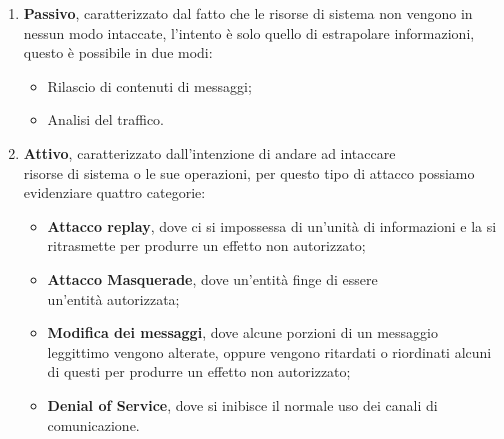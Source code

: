 \documentclass[14pt]{extarticle}
\begin{document}
\begin{enumerate}
    \item \textbf{Passivo}, caratterizzato dal fatto che le risorse di sistema
    non vengono in nessun modo intaccate, l'intento è solo quello di estrapolare
    informazioni, questo è possibile in due modi:
    \begin{itemize}
        \item Rilascio di contenuti di messaggi;
        \item Analisi del traffico.
    \end{itemize}
    \item \textbf{Attivo}, caratterizzato dall'intenzione di andare ad intaccare
    \\ risorse di sistema o le sue operazioni, per questo tipo di attacco
    possiamo evidenziare quattro categorie:
    \begin{itemize}
        \item \textbf{Attacco replay}, dove ci si impossessa di un'unità di
        informazioni e la si ritrasmette per produrre un effetto non
        autorizzato;
        \item \textbf{Attacco Masquerade}, dove un'entità finge di essere \\
        un'entità autorizzata;
        \item \textbf{Modifica dei messaggi}, dove alcune porzioni di un
        messaggio leggittimo vengono alterate, oppure vengono ritardati o
        riordinati alcuni di questi per produrre un effetto non autorizzato;
        \item \textbf{Denial of Service}, dove si inibisce il normale uso dei
        canali di comunicazione.
    \end{itemize} 
\end{enumerate}
\end{document}
